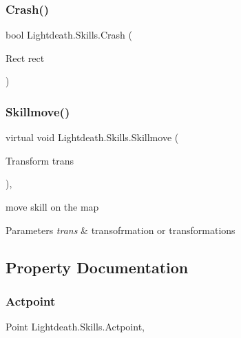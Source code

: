 \subsubsection{\texorpdfstring{Crash()}{Crash()}}
{\footnotesize\ttfamily bool Lightdeath.\+Skills.\+Crash (\begin{DoxyParamCaption}\item[{Rect}]{rect }\end{DoxyParamCaption})\hspace{0.3cm}{\ttfamily [inline]}}

\hypertarget{class_lightdeath_1_1_skills_a744fee585abda76560f2ca9dcce19cd0}{}\label{class_lightdeath_1_1_skills_a744fee585abda76560f2ca9dcce19cd0} 
\subsubsection{\texorpdfstring{Skillmove()}{Skillmove()}}
{\footnotesize\ttfamily virtual void Lightdeath.\+Skills.\+Skillmove (\begin{DoxyParamCaption}\item[{Transform}]{trans }\end{DoxyParamCaption})\hspace{0.3cm}{\ttfamily [inline]}, {\ttfamily [virtual]}}



move skill on the map 


\begin{DoxyParams}{Parameters}
{\em trans} & transofrmation or transformations\\
\hline
\end{DoxyParams}


\subsection{Property Documentation}
\hypertarget{class_lightdeath_1_1_skills_a56fbb1a1791224bb4f7539a74478a77e}{}\label{class_lightdeath_1_1_skills_a56fbb1a1791224bb4f7539a74478a77e} 
\subsubsection{\texorpdfstring{Actpoint}{Actpoint}}
{\footnotesize\ttfamily Point Lightdeath.\+Skills.\+Actpoint\hspace{0.3cm}{\ttfamily [get]}, {\ttfamily [set]}}



